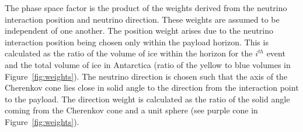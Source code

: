 


The phase space factor is the product of the weights derived from the neutrino interaction position and neutrino direction.
These weights are assumed to be independent of one another.
The position weight arises due to the neutrino interaction position being
chosen only within the payload horizon.
This is calculated as
the ratio of the volume of ice within the horizon for the $i^{th}$
event and the total volume of ice in Antarctica (ratio of the yellow to blue
volumes in Figure~\ref{fig:weights}).
The neutrino direction is chosen such that the axis of the Cherenkov cone
lies close in solid angle to the direction from the interaction point to the payload. 
The direction weight is calculated as the ratio of the solid angle coming from the Cherenkov cone and a unit sphere (see purple cone in Figure~\ref{fig:weights}).

